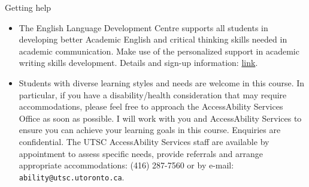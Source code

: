 \documentclass[
  ignorenonframetext,
]{beamer}
\begin{document}
\begin{frame}[fragile]{Getting help}
\protect\hypertarget{getting-help}{}

\begin{itemize}
\item
  The English Language Development Centre supports all students in
  developing better Academic English and critical thinking skills needed
  in academic communication. Make use of the personalized support in
  academic writing skills development. Details and sign-up information:
  \href{http://www.utsc.utoronto.ca/eld/}{link}.
\item
  Students with diverse learning styles and needs are welcome in this
  course. In particular, if you have a disability/health consideration
  that may require accommodations, please feel free to approach the
  AccessAbility Services Office as soon as possible. I will work with
  you and AccessAbility Services to ensure you can achieve your learning
  goals in this course. Enquiries are confidential. The UTSC
  AccessAbility Services staff are available by appointment to assess
  specific needs, provide referrals and arrange appropriate
  accommodations: (416) 287-7560 or by e-mail:
  \texttt{ability@utsc.utoronto.ca}.
\end{itemize}

\end{frame}
\end{document}
